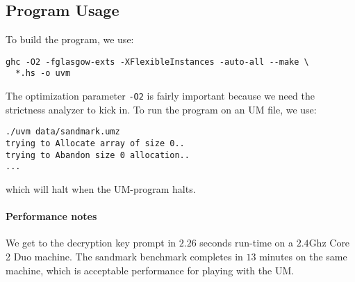 \subsection*{Program Usage}

To build the program, we use:
\begin{verbatim}
ghc -O2 -fglasgow-exts -XFlexibleInstances -auto-all --make \
  *.hs -o uvm
\end{verbatim}

The optimization parameter \texttt{-O2} is fairly important because we
need the strictness analyzer to kick in. To run the program on an UM
file, we use:
\begin{verbatim}
./uvm data/sandmark.umz
trying to Allocate array of size 0..
trying to Abandon size 0 allocation..
...
\end{verbatim}
which will halt when the UM-program halts.

\paragraph{Performance notes}

We get to the decryption key prompt in $2.26$ seconds run-time on a
$2.4$Ghz Core 2 Duo machine. The sandmark benchmark completes in $13$
minutes on the same machine, which is acceptable performance for
playing with the UM.

